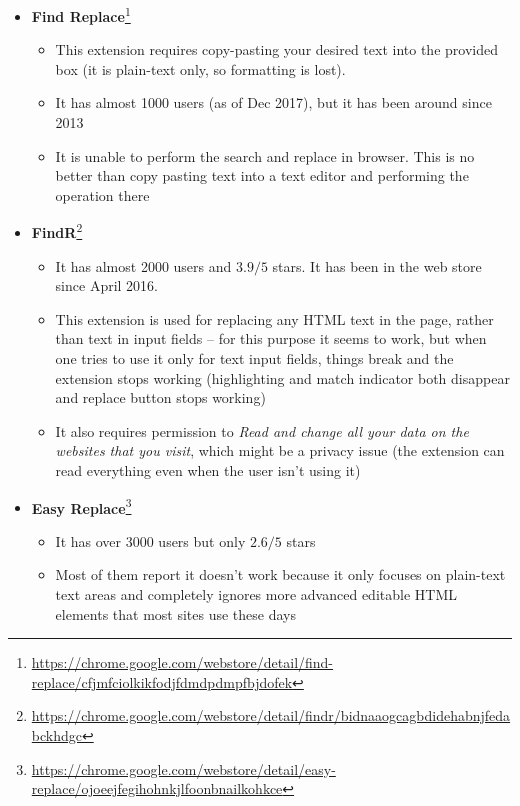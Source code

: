 \documentclass[bsc,frontabs,twoside,singlespacing,parskip,deptreport]{infthesis}
\providecommand{\tightlist}{%
  \setlength{\itemsep}{0pt}\setlength{\parskip}{0pt}}
\begin{document}
\begin{itemize}
\item
  {\bf Find Replace}\footnote{\href{https://chrome.google.com/webstore/detail/find-replace/cfjmfciolkikfodjfdmdpdmpfbjdofek}{https://chrome.google.com/webstore/detail/find-replace/cfjmfciolkikfodjfdmdpdmpfbjdofek}}
  \begin{itemize}
  \tightlist
\item
  This extension requires copy-pasting your desired text into the provided box (it is plain-text only, so formatting is lost).
\item
  It has almost 1000 users (as of Dec 2017), but it has been around since 2013
\item
  It is unable to perform the search and replace in browser. This is no better than copy pasting text into a text editor and performing the operation there
  \end{itemize}
\item
  \textbf{FindR}\footnote{\href{https://chrome.google.com/webstore/detail/findr/bidnaaogcagbdidehabnjfedabckhdgc}{https://chrome.google.com/webstore/detail/findr/bidnaaogcagbdidehabnjfedabckhdgc}}
  \begin{itemize}
  \tightlist
\item
  It has almost 2000 users and $3.9/5$ stars. It has been in the web store since April 2016.
\item
  This extension is used for replacing any HTML text in the page, rather than text in input fields -- for this purpose it seems to work, but when one tries to use it only for text input fields, things break and the extension stops working (highlighting and match indicator both disappear and replace button stops working)
\item
  It also requires permission to \textit{Read and change all your data on the websites that you visit}, which might be a privacy issue (the extension can read everything even when the user isn't using it)
  \end{itemize}
\item
  \textbf{Easy Replace}\footnote{\href{https://chrome.google.com/webstore/detail/easy-replace/ojoeejfegihohnkjlfoonbnailkohkce}{https://chrome.google.com/webstore/detail/easy-replace/ojoeejfegihohnkjlfoonbnailkohkce}}
  \begin{itemize}
  \tightlist
\item
  It has over 3000 users but only $2.6/5$ stars
\item
  Most of them report it doesn't work because it only focuses on plain-text text areas and completely ignores more advanced editable HTML elements that most sites use these days
  \end{itemize}
\end{itemize}
\end{document}
